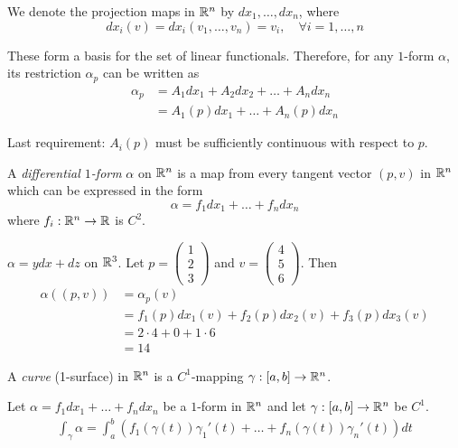 \documentclass[11pt]{article}
\begin{document}
We denote the projection maps in $\mathbb{R}^n$ by $dx_1, \dots, dx_n$, where $$dx_i(v) = dx_i(v_1, \dots, v_n) = v_i, \quad \forall i = 1, \dots, n$$

These form a basis for the set of linear functionals. Therefore, for any $1$-form $\alpha$, its restriction $\alpha_p$ can be written as \begin{align*} \alpha_p & = A_1dx_1 + A_2dx_2 + \dots + A_ndx_n \\ & = A_1(p) dx_1 + \dots + A_n(p)dx_n \end{align*}

Last requirement: $A_i(p)$ must be sufficiently continuous with respect to $p$.

\begin{definition} A \emph{differential $1$-form} $\alpha$ on $\mathbb{R}^n$ is a map from every tangent vector $(p, v)$ in $\mathbb{R}^n$ which can be expressed in the form $$\alpha = f_1dx_1 + \dots + f_ndx_n$$ where $f_i: \mathbb{R}^n \to \mathbb{R}$ is $C^2$.
\end{definition}

\begin{example} $\alpha = ydx + dz$ on $\mathbb{R}^3$. Let $p = \begin{pmatrix} 1 \\ 2 \\ 3 \end{pmatrix}$ and $v = \begin{pmatrix} 4 \\ 5 \\ 6 \end{pmatrix}$. Then \begin{align*} \alpha((p, v)) & = \alpha_p(v) \\ & = f_1(p) dx_1(v) + f_2(p) dx_2(v) + f_3(p) dx_3(v) \\ & = 2 \cdot 4 + 0 + 1 \cdot 6 \\ & = 14 \end{align*}
\end{example}

\begin{definition} A \emph{curve} (1-surface) in $\mathbb{R}^n$ is a $C^1$-mapping $\gamma: [a, b] \to \mathbb{R}^n$.
\end{definition}

\begin{definition} Let $\alpha = f_1dx_1 + \dots + f_ndx_n$ be a $1$-form in $\mathbb{R}^n$ and let  $\gamma: [a, b] \to \mathbb{R}^{n}$ be $C^1$. \begin{align*} \int_{\gamma} \alpha = \int_a^b (f_1 (\gamma(t))\gamma_1'(t) + \dots + f_n (\gamma(t)) \gamma_n'(t)) dt \end{align*}
\end{definition}
\end{document}

